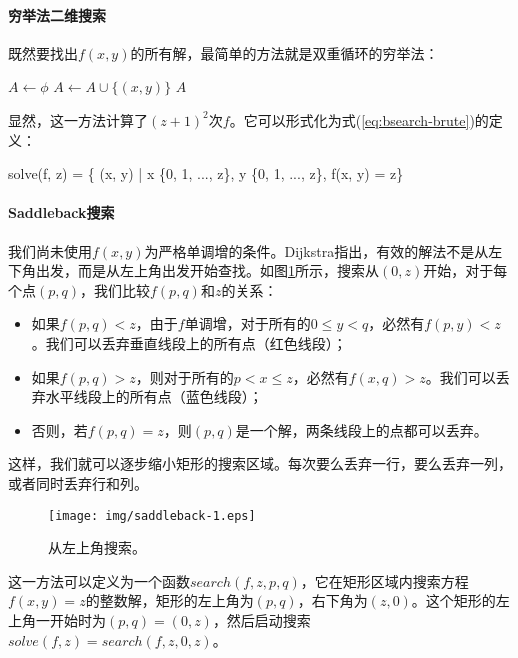 \documentclass[UTF8]{article}
\begin{document}
\paragraph{穷举法二维搜索}

既然要找出$f(x, y)$的所有解，最简单的方法就是双重循环的穷举法：

\begin{algorithmic}[1]
  \State $A \gets \phi$
        \State $A \gets A \cup \{(x, y)\}$
      \EndIf
    \EndFor
  \EndFor
  \State \Return $A$
\EndFunction
\end{algorithmic}

显然，这一方法计算了$(z+1)^2$次$f$。它可以形式化为式(\ref{eq:bsearch-brute})的定义：

\be
solve(f, z) = \{ (x, y) | x \in \{0, 1, ..., z\}, y \in \{0, 1, ..., z\}, f(x, y) = z\}
\label{eq:bsearch-brute}
\ee

\paragraph{Saddleback搜索}

我们尚未使用$f(x, y)$为严格单调增的条件。Dijkstra指出\cite{saddle-back}，有效的解法不是从左下角出发，而是从左上角出发开始查找。如图\ref{fig:saddleback-1}所示，搜索从$(0, z)$开始，对于每个点$(p, q)$，我们比较$f(p, q)$和$z$的关系：

\begin{itemize}
\item 如果$f(p, q) < z$，由于$f$单调增，对于所有的$0 \leq y < q$，必然有$f(p, y) < z$。我们可以丢弃垂直线段上的所有点（红色线段）；
\item 如果$f(p, q) > z$，则对于所有的$p < x \leq z$，必然有$f(x, q) > z$。我们可以丢弃水平线段上的所有点（蓝色线段）；
\item 否则，若$f(p, q) = z$，则$(p, q)$是一个解，两条线段上的点都可以丢弃。
\end{itemize}

这样，我们就可以逐步缩小矩形的搜索区域。每次要么丢弃一行，要么丢弃一列，或者同时丢弃行和列。

\begin{figure}[htbp]
 \centering
 \texttt{[image: img/saddleback-1.eps]}
 \caption{从左上角搜索。}
 \label{fig:saddleback-1}
\end{figure}

这一方法可以定义为一个函数$search(f, z, p, q)$，它在矩形区域内搜索方程$f(x, y) = z$的整数解，矩形的左上角为$(p, q)$，右下角为$(z, 0)$。这个矩形的左上角一开始时为$(p, q) = (0, z)$，然后启动搜索$solve(f, z) = search(f, z, 0, z)$。
\end{document}
